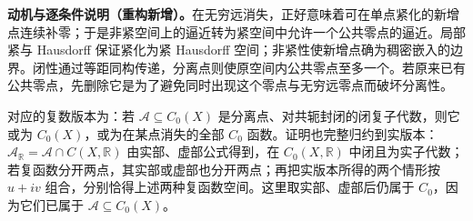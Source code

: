 \documentclass[../../main.tex]{subfiles}%
\begin{document}
\begin{remark}
\textbf{动机与逐条件说明（重构新增）。}在无穷远消失，正好意味着可在单点紧化的新增点连续补零；于是非紧空间上的逼近转为紧空间中允许一个公共零点的逼近。局部紧与 Hausdorff 保证紧化为紧 Hausdorff 空间；非紧性使新增点确为稠密嵌入的边界。闭性通过等距同构传递，分离点则使原空间内公共零点至多一个。若原来已有公共零点，先删除它是为了避免同时出现这个零点与无穷远零点而破坏分离性。

对应的复数版本为：若 $\mathcal A\subseteq C_0(X)$ 是分离点、对共轭封闭的闭复子代数，则它或为 $C_0(X)$，或为在某点消失的全部 $C_0$ 函数。证明也完整归约到实版本：$\mathcal A_{\mathbb R}=\mathcal A\cap C(X,\mathbb R)$ 由实部、虚部公式得到，在 $C_0(X,\mathbb R)$ 中闭且为实子代数；若复函数分开两点，其实部或虚部也分开两点；再把实版本所得的两个情形按 $u+iv$ 组合，分别恰得上述两种复函数空间。这里取实部、虚部后仍属于 $C_0$，因为它们已属于 $\mathcal A\subseteq C_0(X)$。
\end{remark}
\end{document}
